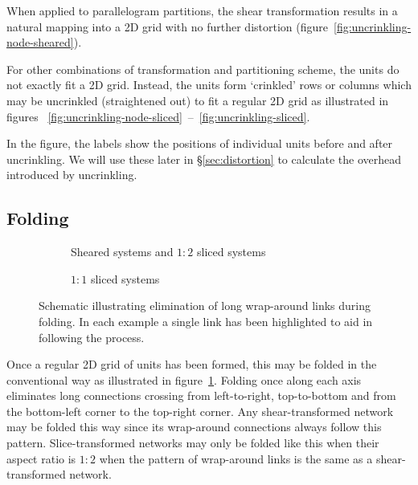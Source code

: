 			When applied to parallelogram partitions, the shear transformation
			results in a natural mapping into a 2D grid with no further distortion
			(figure~\ref{fig:uncrinkling-node-sheared}).
			
			For other combinations of transformation and partitioning scheme, the
			units do not exactly fit a 2D grid. Instead, the units form `crinkled'
			rows or columns which may be uncrinkled (straightened out) to fit a
			regular 2D grid as illustrated in figures~
			\ref{fig:uncrinkling-node-sliced}~--~\ref{fig:uncrinkling-sliced}.
			
			In the figure, the labels show the positions of individual units before
			and after uncrinkling. We will use these later in \S\ref{sec:distortion}
			to calculate the overhead introduced by uncrinkling.
		
		\subsection{Folding}
			
			\begin{figure}
				\begin{subfigure}{\linewidth}
					\center
					\caption{Sheared systems and $1:2$ sliced systems}
					\label{fig:folding-sheared}
				\end{subfigure}
				
				\vspace{1em}
				
				\begin{subfigure}{\linewidth}
					\center
					\caption{$1:1$ sliced systems}
					\label{fig:folding-sliced}
				\end{subfigure}
				
				\caption[Elimination of long wrap-around links by folding.]%
				{Schematic illustrating elimination of long wrap-around links
				during folding. In each example a single link has been highlighted to
				aid in following the process.}
				\label{fig:folding}
			\end{figure}
			
			Once a regular 2D grid of units has been formed, this may be folded in
			the conventional way as illustrated in figure~\ref{fig:folding-sheared}.
			Folding once along each axis eliminates long connections crossing from
			left-to-right, top-to-bottom and from the bottom-left corner to the
			top-right corner. Any shear-transformed network may be folded this way
			since its wrap-around connections always follow this pattern.
			Slice-transformed networks may only be folded like this when their aspect
			ratio is $1:2$ when the pattern of wrap-around links is the same as a
			shear-transformed network.
			
